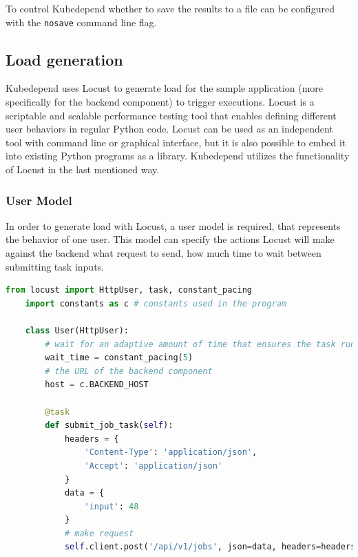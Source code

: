 To control Kubedepend whether to save the results to a file can be configured with the \texttt{nosave} command line flag.

\subsection{Load generation} \label{test-impl-load-generation}


Kubedepend uses Locust \cite{Locust} to generate load for the sample application (more specifically for the backend component) to trigger executions. Locust is a scriptable and scalable performance testing tool that enables defining different user behaviors in regular Python code. Locust can be used as an independent tool with command line or graphical interface, but it is also possible to embed it into existing Python programs as a library. Kubedepend utilizes the functionality of Locust in the last mentioned way.

\subsubsection{User Model}

In order to generate load with Locust, a user model is required, that represents the behavior of one user. This model can specify the actions Locust will make against the backend \eg what request to send, how much time to wait between submitting task inputs.

\vspace{0.5cm}
\begin{minipage}{\linewidth}
	\begin{lstlisting}[language=python, caption={Locust user model}, label={lst:locust-user}]
	from locust import HttpUser, task, constant_pacing
	import constants as c # constants used in the program
	
	class User(HttpUser):
		# wait for an adaptive amount of time that ensures the task runs (at most) once every X seconds
		wait_time = constant_pacing(5)
		# the URL of the backend component
		host = c.BACKEND_HOST
		
		@task
		def submit_job_task(self):
			headers = {
				'Content-Type': 'application/json',
				'Accept': 'application/json'
			}
			data = {
				'input': 48
			}
			# make request
			self.client.post('/api/v1/jobs', json=data, headers=headers)\end{lstlisting}
\end{minipage}

